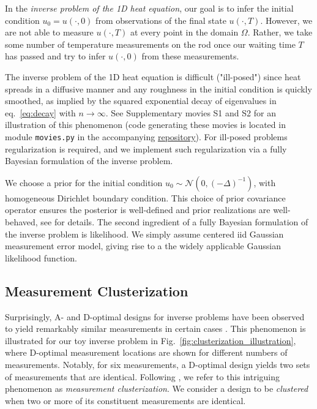 In the \emph{inverse problem of the 1D heat equation}, our goal is to
infer the initial condition $u_0 = u(\cdot, 0)$ from observations of
the final state $u(\cdot, T)$. However, we are not able to measure
$u(\cdot, T)$ at every point in the domain $\Omega$. Rather, we take
some number of temperature measurements on the rod once our waiting
time $T$ has passed and try to infer $u(\cdot, 0)$ from these
measurements.

The inverse problem of the 1D heat equation is difficult ("ill-posed")
since heat spreads in a diffusive manner and any roughness in the
initial condition is quickly smoothed, as implied by the squared
exponential decay of eigenvalues in eq.~\eqref{eq:decay} with
$n\to\infty$. See Supplementary movies S1 and S2 for an illustration
of this phenomenon (code generating these movies is located in module
\texttt{movies.py} in the accompanying
\href{https://github.com/yairdaon/OED}{repository}). For ill-posed
problems regularization is required, and we implement such
regularization via a fully Bayesian formulation of the inverse
problem.

We choose a prior for the initial condition $u_0 \sim \mathcal{N}(0,
(-\Delta)^{-1})$, with homogeneous Dirichlet boundary condition. This
choice of prior covariance operator ensures the posterior is
well-defined and prior realizations are well-behaved, see
\cite[Theorem 3.1 and Lemma 6.25]{Stuart10} for details. The second
ingredient of a fully Bayesian formulation of the inverse problem is
likelihood. We simply assume centered iid Gaussian measurement error
model, giving rise to a the widely applicable Gaussian likelihood
function.


\subsection{Measurement Clusterization}
Surprisingly, A- and D-optimal designs for inverse problems have been
observed to yield remarkably similar measurements in certain cases
\cite{fedorovDesignSpatialExperiments1996, nyberg2012, fedorov1997,
  Ucinski05, neitzel2019sparse}. This phenomenon is illustrated for
our toy inverse problem in Fig.~\ref{fig:clusterization_illustration},
where D-optimal measurement locations are shown for different numbers
of measurements. Notably, for six measurements, a D-optimal design
yields two sets of measurements that are identical. Following
\cite{Ucinski05}, we refer to this intriguing phenomenon as
\emph{measurement clusterization}. We consider a design to be
\emph{clustered} when two or more of its constituent measurements are
identical.


